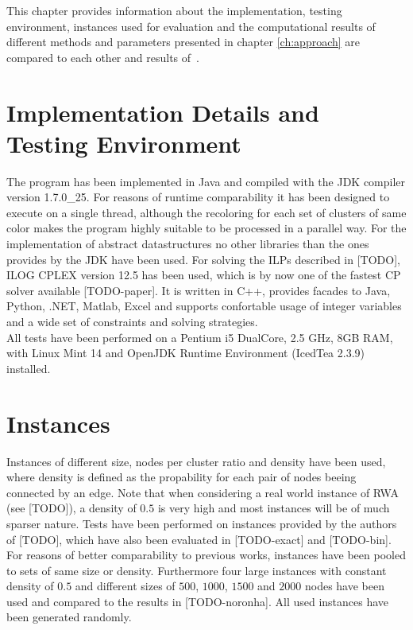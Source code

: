This chapter provides information about the implementation, testing environment, instances used for evaluation and the computational results of different methods and parameters presented in chapter \ref{ch:approach} are compared to each other and results of~\cite{li-00}.

\section{Implementation Details and Testing Environment}
The program has been implemented in Java and compiled with the JDK compiler version 1.7.0\_25. For reasons of runtime comparability it has been designed to execute on a single thread, although the recoloring for each set of clusters of same color makes the program highly suitable to be processed in a parallel way. For the implementation of abstract datastructures no other libraries than the ones provides by the JDK have been used. For solving the ILPs described in [TODO], ILOG CPLEX version 12.5 has been used, which is by now one of the fastest CP solver available [TODO-paper]. It is written in C++, provides facades to Java, Python, .NET, Matlab, Excel and supports confortable usage of integer variables and a wide set of constraints and solving strategies.\\
All tests have been performed on a Pentium i5 DualCore, 2.5 GHz, 8GB RAM, with Linux Mint 14 and OpenJDK Runtime Environment (IcedTea 2.3.9) installed.

\section{Instances}
Instances of different size, nodes per cluster ratio and density have been used, where density is defined as the propability for each pair of nodes beeing connected by an edge. Note that when considering a real world instance of RWA (see [TODO]), a density of $0.5$ is very high and most instances will be of much sparser nature. Tests have been performed on instances provided by the authors of [TODO], which have also been evaluated in [TODO-exact] and [TODO-bin]. For reasons of better comparability to previous works, instances have been pooled to sets of same size or density.
Furthermore four large instances with constant density of $0.5$ and different sizes of $500$, $1000$, $1500$ and $2000$ nodes have been used and compared to the results in [TODO-noronha]. All used instances have been generated randomly. %

